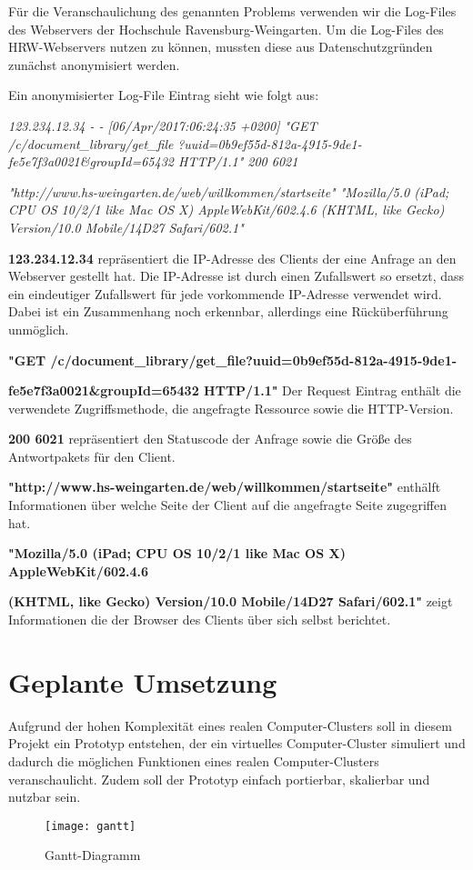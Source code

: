 Für die Veranschaulichung des genannten Problems verwenden wir die Log-Files des Webservers der Hochschule Ravensburg-Weingarten. Um die Log-Files des HRW-Webservers nutzen zu können, mussten diese aus Datenschutzgründen zunächst anonymisiert werden.

Ein anonymisierter Log-File Eintrag sieht wie folgt aus:

\textit{123.234.12.34 - - [06/Apr/2017:06:24:35 +0200] "GET /c/document\_{}library/get\_{}file}
\textit{?uuid=0b9ef55d-812a-4915-9de1-fe5e7f3a0021\&{}groupId=65432 HTTP/1.1" 200 6021}

\textit{"http://www.hs-weingarten.de/web/willkommen/startseite"  "Mozilla/5.0 (iPad; CPU OS 10/2/1 like Mac OS X) AppleWebKit/602.4.6 (KHTML, like Gecko) Version/10.0 Mobile/14D27 Safari/602.1" }

\pagebreak

\textbf{123.234.12.34} repräsentiert die IP-Adresse des Clients der eine Anfrage an den Webserver gestellt hat. Die IP-Adresse ist durch einen Zufallswert so ersetzt, dass ein eindeutiger Zufallswert für jede vorkommende IP-Adresse verwendet wird. Dabei ist ein Zusammenhang noch erkennbar, allerdings eine Rücküberführung unmöglich.

\textbf{"GET /c/document\_{}library/get\_{}file?uuid=0b9ef55d-812a-4915-9de1-}

\textbf{fe5e7f3a0021\&{}groupId=65432 HTTP/1.1"} Der Request Eintrag enthält die verwendete Zugriffsmethode, die angefragte Ressource sowie die HTTP-Version.

\textbf{200 6021} repräsentiert den Statuscode der Anfrage sowie die Größe des Antwortpakets für den Client.

\textbf{"http://www.hs-weingarten.de/web/willkommen/startseite"} enthälft Informationen über welche Seite der Client auf die angefragte Seite zugegriffen hat.

\textbf{"Mozilla/5.0 (iPad; CPU OS 10/2/1 like Mac OS X) AppleWebKit/602.4.6}

\textbf{(KHTML, like Gecko) Version/10.0 Mobile/14D27 Safari/602.1"} zeigt Informationen die der Browser des Clients über sich selbst berichtet.


\section{Geplante Umsetzung}
\label{sec:GeplanteUmsetzung}

Aufgrund der hohen Komplexität eines realen Computer-Clusters soll in diesem Projekt ein Prototyp entstehen, der ein virtuelles Computer-Cluster simuliert und dadurch die möglichen Funktionen eines realen Computer-Clusters veranschaulicht. Zudem soll der Prototyp einfach portierbar, skalierbar und nutzbar sein.

\begin{figure}[!htb]
	\centering
	\texttt{[image: gantt]}
	\caption{Gantt-Diagramm}
	\label{img:gantt}
\end{figure} 